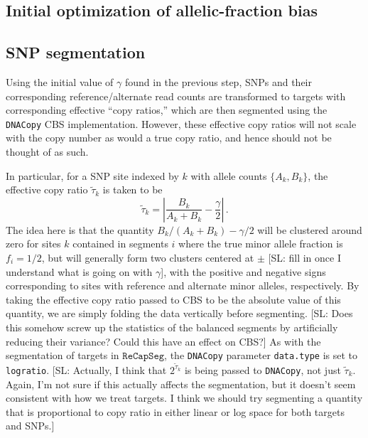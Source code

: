 \documentclass[nofootinbib,amssymb,amsmath]{revtex4}
\newcommand{\RCS}{\texttt{ReCapSeg}}
\def\SL#1{{\color [rgb]{0,0,0.8} [SL: #1]}}
\begin{document}
\subsection{Initial optimization of allelic-fraction bias} \label{initial-optimization-of-allelic-fraction-bias}

\subsection{SNP segmentation} \label{snp-segmentation}

Using the initial value of $\gamma$ found in the previous step, SNPs and their corresponding reference/alternate read counts are transformed to targets with corresponding effective ``copy ratios,'' which are then segmented using the \texttt{DNACopy} CBS implementation.  However, these effective copy ratios will not scale with the copy number as would a true copy ratio, and hence should not be thought of as such.

In particular, for a SNP site indexed by $k$ with allele counts $\{A_k, B_k\}$, the effective copy ratio $\tilde\tau_k $ is taken to be 
\begin{equation}
\tilde\tau_k =\left |\frac{B_k}{A_k + B_k} - \frac{\gamma}{2}\right|\,.
\end{equation}
The idea here is that the quantity $B_k / (A_k + B_k) - \gamma / 2$ will be clustered around zero for sites $k$ contained in segments $i$ where the true minor allele fraction is $f_i = 1/2$, but will generally form two clusters centered at $\pm$ \SL{fill in once I understand what is going on with $\gamma$}, with the positive and negative signs corresponding to sites with reference and alternate minor alleles, respectively.  By taking the effective copy ratio passed to CBS to be the absolute value of this quantity, we are simply folding the data vertically before segmenting.  \SL{Does this somehow screw up the statistics of the balanced segments by artificially reducing their variance?  Could this have an effect on CBS?}  As with the segmentation of targets in $\RCS$, the \texttt{DNACopy} parameter \texttt{data.type} is set to \texttt{logratio}.  \SL{Actually, I think that $2^{\tilde\tau_k}$ is being passed to \texttt{DNACopy}, not just $\tilde\tau_k$. Again, I'm not sure if this actually affects the segmentation, but it doesn't seem consistent with how we treat targets.  I think we should try segmenting a quantity that is proportional to copy ratio in either linear or log space for both targets and SNPs.}
\end{document}
